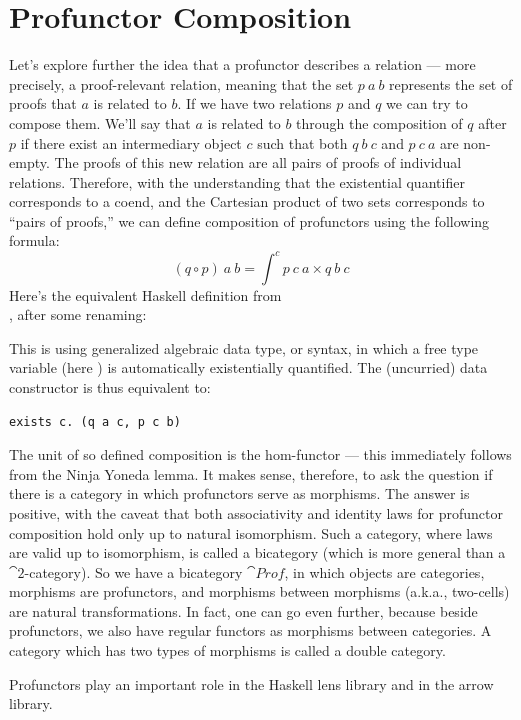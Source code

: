 \section{Profunctor Composition}

Let's explore further the idea that a profunctor describes a relation
--- more precisely, a proof-relevant relation, meaning that the set
$p\ a\ b$ represents the set of proofs that $a$ is related
to $b$. If we have two relations $p$ and $q$ we can
try to compose them. We'll say that $a$ is related to $b$
through the composition of $q$ after $p$ if there exist an
intermediary object $c$ such that both $q\ b\ c$ and
$p\ c\ a$ are non-empty. The proofs of this new relation are all
pairs of proofs of individual relations. Therefore, with the
understanding that the existential quantifier corresponds to a coend,
and the Cartesian product of two sets corresponds to ``pairs of
proofs,'' we can define composition of profunctors using the following
formula:
\[(q \circ p)\ a\ b = \int^c p\ c\ a\times{}q\ b\ c\]
Here's the equivalent Haskell definition from\\
, after some renaming:

This is using generalized algebraic data type, or  syntax, in which
a free type variable (here ) is automatically existentially
quantified. The (uncurried) data constructor  is
thus equivalent to:

\begin{Verbatim}
exists c. (q a c, p c b)
\end{Verbatim}
The unit of so defined composition is the hom-functor --- this
immediately follows from the Ninja Yoneda lemma. It makes sense,
therefore, to ask the question if there is a category in which
profunctors serve as morphisms. The answer is positive, with the caveat
that both associativity and identity laws for profunctor composition
hold only up to natural isomorphism. Such a category, where laws are
valid up to isomorphism, is called a bicategory (which is more general
than a $\cat{2}$-category). So we have a bicategory $\cat{Prof}$, in which
objects are categories, morphisms are profunctors, and morphisms between
morphisms (a.k.a., two-cells) are natural transformations. In fact, one
can go even further, because beside profunctors, we also have regular
functors as morphisms between categories. A category which has two types
of morphisms is called a double category.

Profunctors play an important role in the Haskell lens library and in
the arrow library.
